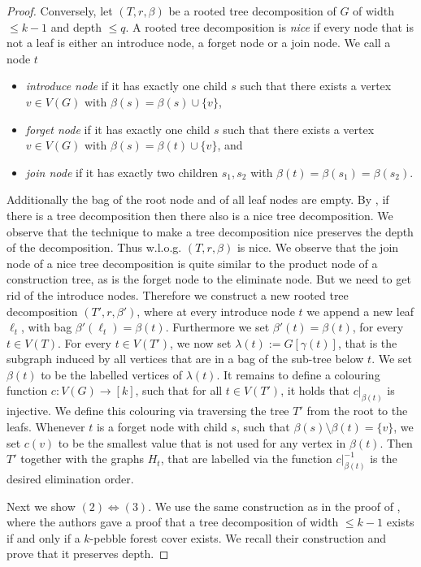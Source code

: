 \documentclass[a4paper,UKenglish,cleveref, autoref, thm-restate]{lipics-v2021}
\begin{document}
\begin{proof}
	Conversely, let $(T,r,\beta)$ be a rooted tree decomposition of $G$ of width $\leq k-1$ and depth $\leq q$.
	A rooted tree decomposition is \emph{nice} if every node that is not a leaf is either an introduce node, a forget node or a join node.
	We call a node $t$ 
	\begin{itemize}
		\item \emph{introduce node} if it has exactly one child $s$ such that there exists a vertex $v\in V(G)$ with $\beta(s)=\beta(s)\cup \{v\} $,
		\item \emph{forget node} if it has exactly one child $s$ such that there exists a vertex $v\in V(G)$ with $\beta(s)=\beta(t)\cup \{v\}$, and 
		\item \emph{join node} if it has exactly two children $s_1,s_2$ with $\beta(t)=\beta(s_1)=\beta(s_2)$.
	\end{itemize}
	Additionally the bag of the root node and of all leaf nodes are empty.
	By \cite{bodlaender_partial_1998}, if there is a tree decomposition then there also is a nice tree decomposition.
	We observe that the technique to make a tree decomposition nice preserves the depth of the decomposition.
	Thus w.l.o.g. $(T,r,\beta)$ is nice.
	We observe that the join node of a nice tree decomposition is quite similar to the product node of a construction tree, as is the forget node to the eliminate node.
	But we need to get rid of the introduce nodes.
	Therefore we construct a new rooted tree decomposition $(T',r,\beta')$, where at every introduce node $t$ we append a new leaf $\ell_t$, with bag $\beta'(\ell_t)=\beta(t)$.
	Furthermore we set $\beta'(t)=\beta(t)$, for every $t\in V(T)$.
	For every $t\in V(T')$, we now set $\lambda(t):=G[\gamma(t)]$, that is the subgraph induced by all vertices that are in a bag of the sub-tree below $t$.
	We set $\beta(t)$ to be the labelled vertices of $\lambda(t)$.
	It remains to define a colouring function $c\colon V(G)\rightarrow [k]$, such that for all $t\in V(T')$, it holds that $c|_{\beta(t)}$ is injective.
	We define this colouring via traversing the tree $T'$ from the root to the leafs.
	Whenever $t$ is a forget node with child $s$, such that $\beta(s)\setminus\beta(t)=\{v\}$, we set $c(v)$ to be the smallest value that is not used for any vertex in $\beta(t)$.
	Then $T'$ together with the graphs $H_t$, that are labelled via the function $c|_{\beta(t)}^{-1}$ is the desired elimination order.
	
	Next we show $(2)\Leftrightarrow (3)$.
	We use the same construction as in the proof of \cite[Theorem~19]{abramsky_relating_2021}, where the authors gave a proof that a tree decomposition of width $\leq k-1$ exists if and only if a $k$-pebble forest cover exists.
	We recall their construction and prove that it preserves depth.
	

\end{proof}
\end{document}
